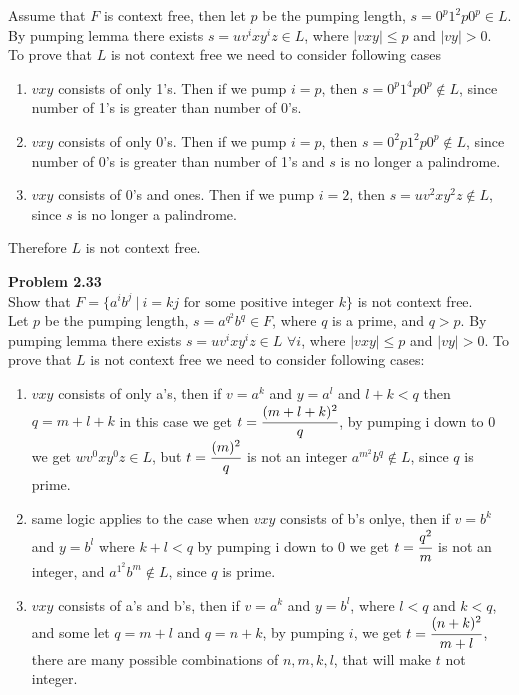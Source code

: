 \documentclass{article}
\newcommand{\problem}[1]{\large{\textbf{Problem #1} \\}}
\begin{document}
Assume that $F$ is context free, then let $p$ be the pumping length, $s = 0^p 1^2p 0^p \in L$. By pumping lemma 
there exists $s = uv^ixy^iz \in L$, where $|vxy| \leq p$ and $|vy| > 0$. To prove
that $L$ is not context free we need to consider following cases \\

\begin{enumerate}[\underline{Case} 1., leftmargin = 1.5cm]
\itemsep0em
\item $vxy$ consists of only 1's. Then if we pump $i = p$, then $s = 0^p 1^4p 0^p \notin L$, since
number of 1's is greater than number of 0's.
\item $vxy$ consists of only 0's. Then if we pump $i = p$, then $s = 0^2p 1^2p 0^p \notin L$, since
number of 0's is greater than number of 1's and $s$ is no longer a palindrome.
\item $vxy$ consists of 0's and ones. Then if we pump $i = 2$, then $s = u v^2 x y^2 z \notin L$, since
$s$ is no longer a palindrome.
\end{enumerate}

Therefore $L$ is not context free.

\vspace{0.4cm}
\problem{2.33}
Show that $F = \{a^i b^j\: |\: i = kj\text{ for some positive integer } k\}$ is not context free. \\

Let $p$ be the pumping length, $s = a^{q^2} b^q \in F$, where $q$ is a prime, and $q > p$. By pumping lemma 
there exists $s = uv^ixy^iz \in L$ $\forall i$, where $|vxy| \leq p$ and $|vy| > 0$. To prove
that $L$ is not context free we need to consider following cases:

\begin{enumerate}[\underline{Case} 1., leftmargin = 1.5cm]
\itemsep0em
\item $vxy$ consists of only a's, then if $v = a^k$ and $y = a^l$ and $l + k < q$ then $q = m + l + k$ in this case we get 
    $t = \cfrac{(m+l+k)^2 }{q}$, by pumping i down to 0 we get $wv^0xy^0z \in L$, but $t = \cfrac{(m)^2 }{q}$ is not an integer
     $a^{m^2}b^q \notin L$, since $q$ is prime.
\item same logic applies to the case when $vxy$ consists of b's onlye, then if $v = b^k$ and $y =b^l$ where $k+l < q$
    by pumping i down to 0 we get $t = \cfrac{q^2}{m}$ is not an integer, and 
     $a^{1^2}b^m \notin L$, since $q$ is prime.
\item $vxy$ consists of a's and b's, then if $v = a^k$ and $y =b^l$, where $l < q$ and $k < q$, and some let $q = m +l$ 
    and $q = n + k$, by pumping $i$, we get
    $t = \cfrac{(n+k)^2 }{m+l}$,
    there are many possible combinations of $n,m,k,l$, that will make $t$ not integer.
\end{enumerate}
\end{document}
